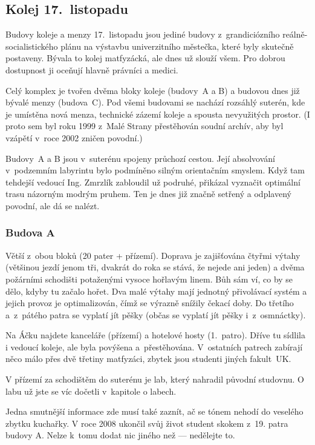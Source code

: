 \subsection{Kolej 17.~listopadu}


Budovy koleje a menzy 17.~listopadu jsou jediné budovy z~grandiciózního
re\-ál\-ně-so\-ci\-a\-lis\-tic\-kého plánu na výstavbu
univerzitního městečka, které byly skutečně postaveny. Bývala to
kolej matfyzácká, ale dnes už slouží všem. Pro dobrou dostupnost
ji oceňují hlavně právníci a medici.

Celý komplex je tvořen dvěma bloky koleje (budovy~A a B) a budovou
dnes již bývalé menzy (budova~C). Pod všemi budovami se nachází
rozsáhlý suterén, kde je umístěna nová menza, technické zázemí
koleje a spousta nevyužitých prostor. (I proto sem byl roku 1999
z~Malé Strany přestěhován soudní archív, aby byl vzápětí v~roce
2002 zničen povodní.)

Budovy~A a B jsou v~suterénu spojeny průchozí cestou. Její
absolvování v~podzemním labyrintu bylo podmíněno silným
orientačním smyslem.  Když tam tehdejší vedoucí Ing. Zmrzlík
zabloudil už podruhé, přikázal vyznačit optimální trasu názorným
modrým pruhem. Ten je dnes již značně setřený a odplavený povodní,
ale dá se nalézt.


\subsubsection{Budova A}

Větší z~obou bloků (20 pater + přízemí). Doprava je zajišťována
čtyřmi výtahy (většinou jezdí jenom tři, dvakrát do roka se stává,
že nejede ani jeden) a dvěma požárními schodišti potaženými vysoce
hořlavým linem. Bůh sám ví, co by se dělo, kdyby tu začalo hořet.
Dva malé výtahy mají jednotný přivolávací systém a jejich provoz
je optimalizován, čímž se výrazně snížily čekací doby. Do třetího
a~z~pátého patra se vyplatí jít pěšky (občas se vyplatí jít pěšky
i~z~osmnáctky).

Na Áčku najdete kanceláře (přízemí) a hotelové hosty (1.~patro).
Dříve tu sídlila i vedoucí koleje, ale byla povýšena
a~přestěhována. V~ostatních patrech zabírají něco málo přes dvě
třetiny matfyzáci, zbytek jsou studenti jiných fakult~UK.

V přízemí za schodištěm do suterénu je lab, který nahradil původní studovnu. O labu už jste se víc dočetli v~kapitole o labech.

Jedna smutnější informace zde musí také zaznít, ač se tónem nehodí do veselého zbytku kuchařky. V roce 2008 ukončil svůj život student skokem z~19. patra budovy A. Nelze k~tomu dodat nic jiného než --- nedělejte to.

